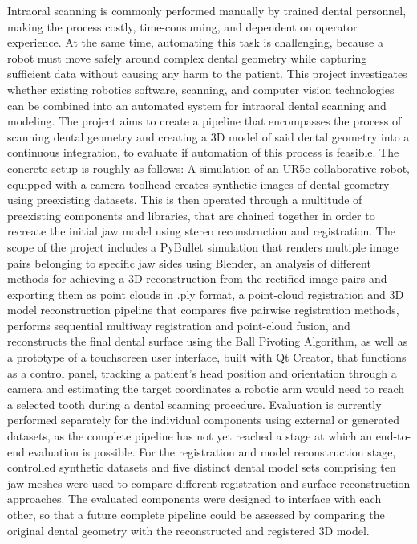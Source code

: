 Intraoral scanning is commonly performed manually by trained dental personnel, making the process costly, time-consuming, and dependent on operator experience. At the same time, automating this task is challenging, because a robot must move safely around complex dental geometry while capturing sufficient data without causing any harm to the patient. This project investigates whether existing robotics software, scanning, and computer vision technologies can be combined into an automated system for intraoral dental scanning and modeling.
\newline\newline
The project aims to create a pipeline that encompasses the process of scanning dental geometry and creating a 3D model of said dental geometry into a continuous integration, to evaluate if automation of this process is feasible. The concrete setup is roughly as follows: A simulation of an UR5e collaborative robot, equipped with a camera toolhead creates synthetic images of dental geometry using preexisting datasets. This is then operated through a multitude of preexisting components and libraries, that are chained together in order to recreate the initial jaw model using stereo reconstruction and registration.
\newline\newline
The scope of the project includes a PyBullet simulation that renders multiple image pairs belonging to specific jaw sides using Blender, an analysis of different methods for achieving a 3D reconstruction from the rectified image pairs and exporting them as point clouds in .ply format, a point-cloud registration and 3D model reconstruction pipeline that compares five pairwise registration methods, performs sequential multiway registration and point-cloud fusion, and reconstructs the final dental surface using the Ball Pivoting Algorithm, as well as a prototype of a touchscreen user interface, built with Qt Creator, that functions as a control panel, tracking a patient's head position and orientation through a camera and estimating the target coordinates a robotic arm would need to reach a selected tooth during a dental scanning procedure.
\newline\newline
Evaluation is currently performed separately for the individual components using external or generated datasets, as the complete pipeline has not yet reached a stage at which an end-to-end evaluation is possible. For the registration and model reconstruction stage, controlled synthetic datasets and five distinct dental model sets comprising ten jaw meshes were used to compare different registration and surface reconstruction approaches. The evaluated components were designed to interface with each other, so that a future complete pipeline could be assessed by comparing the original dental geometry with the reconstructed and registered 3D model.
